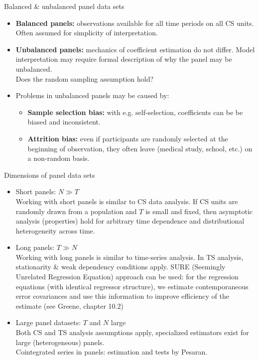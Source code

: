 \documentclass[usenames,dvipsnames]{beamer}
\begin{document}
\begin{frame}{Balanced \& unbalanced panel data sets}
\begin{itemize}
\bigskip
\item \textbf{Balanced panels:} observations available for all time periods on all CS units. Often assumed for simplicity of interpretation.
\bigskip
\item \textbf{Unbalanced panels:} mechanics of coefficient estimation do not differ. Model interpretation may require formal description of why the panel may be unbalanced.\\Does the random sampling assumption hold? 
\bigskip
\item Problems in unbalanced panels may be caused by: 
\medskip
\begin{itemize}
    \item \textbf{Sample selection bias:} with e.g. self-selection, coefficients can be be biased and inconsistent.
    \medskip
    \item \textbf{Attrition bias:} even if participants are randomly selected  at the beginning of observation, they often leave (medical study, school, etc.) on a non-random basis.   
\end{itemize}
\end{itemize}
\end{frame}
\begin{frame}{Dimensions of panel data sets}
\footnotesize
\begin{itemize}
\item Short panels: $N \gg T$ \\
Working with short panels is similar to CS data analysis. If CS units are randomly drawn from a population and $T$ is small and fixed, then asymptotic analysis (properties) hold for arbitrary time dependence and distributional heterogeneity across time.
\medskip
\item Long panels: $T \gg N$ \\
Working with long panels is similar to time-series analysis. In TS analysis, stationarity \& weak dependency conditions apply. SURE (Seemingly Unrelated Regression Equation) approach can be used: for the regression equations (with identical regressor structure), we estimate contemporaneous error covariances and use this information to improve efficiency of the estimate (see Greene, chapter 10.2)
\medskip
\item Large panel datasets: $T$ and $N$ large\\
Both CS and TS analysis assumptions apply, specialized estimators exist for large (heterogeneous) panels.\\Cointegrated series in panels: estimation and tests by Pesaran.
\end{itemize}
\end{frame}
\end{document}
